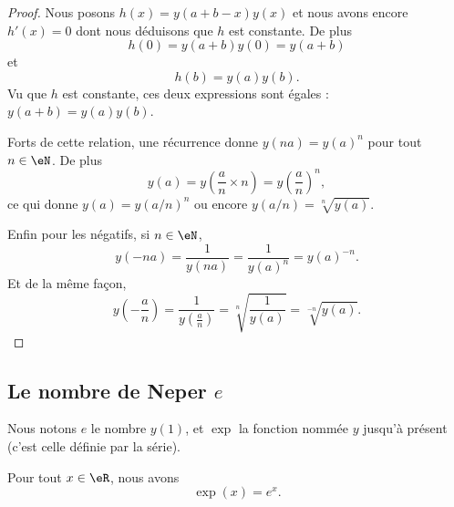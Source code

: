 \begin{proof}
    Nous posons \( h(x)=y(a+b-x)y(x)\) et nous avons encore \( h'(x)=0\) dont nous déduisons que $h$ est constante. De plus
    \begin{equation}
        h(0)=y(a+b)y(0)=y(a+b)
    \end{equation}
    et
    \begin{equation}
        h(b)=y(a)y(b).
    \end{equation}
    Vu que \( h\) est constante, ces deux expressions sont égales : \( y(a+b)=y(a)y(b)\).

    Forts de cette relation, une récurrence donne \( y(na)=y(a)^n\) pour tout \( n\in \eN\). De plus
    \begin{equation}
        y(a)=y\left( \frac{ a }{ n }\times n \right)=y\left( \frac{ a }{ n } \right)^n,
    \end{equation}
    ce qui donne \( y(a)=y(a/n)^n\) ou encore \( y(a/n)=\sqrt[n]{y(a)}\).

    Enfin pour les négatifs, si \( n\in \eN\),
    \begin{equation}
        y(-na)=\frac{1}{ y(na) }=\frac{1}{ y(a)^n }=y(a)^{-n}.
    \end{equation}
    Et de la même façon,
    \begin{equation}
        y\left( -\frac{ a }{ n } \right)=\frac{1}{ y\left( \frac{ a }{ n } \right) }=\sqrt[n]{\frac{1}{ y(a) }}=\sqrt[-n]{y(a)}.
    \end{equation}
\end{proof}

\subsection{Le nombre de Neper \( e\)}

Nous notons \( e\) le nombre \( y(1)\), et \( \exp\) la fonction nommée \( y\) jusqu'à présent (c'est celle définie par la série).

\begin{proposition}     \label{PropCELWooLBSYmS}
    Pour tout \( x\in \eR\), nous avons
    \begin{equation}        \label{EQooBFIHooKopcmf}
        \exp(x)=e^x.
    \end{equation}
\end{proposition}

